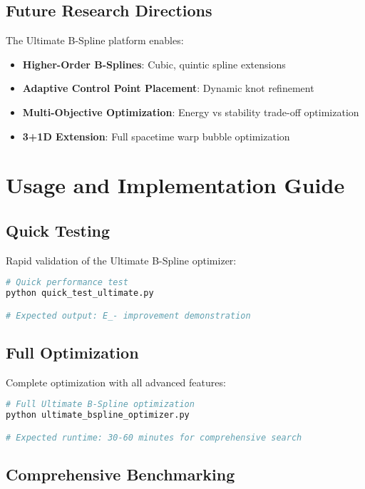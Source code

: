 \documentclass[11pt,a4paper]{article}
\begin{document}
\subsection{Future Research Directions}

The Ultimate B-Spline platform enables:

\begin{itemize}
\item \textbf{Higher-Order B-Splines}: Cubic, quintic spline extensions
\item \textbf{Adaptive Control Point Placement}: Dynamic knot refinement
\item \textbf{Multi-Objective Optimization}: Energy vs stability trade-off optimization
\item \textbf{3+1D Extension}: Full spacetime warp bubble optimization
\end{itemize}

\section{Usage and Implementation Guide}

\subsection{Quick Testing}

Rapid validation of the Ultimate B-Spline optimizer:

\begin{lstlisting}[language=bash]
# Quick performance test
python quick_test_ultimate.py

# Expected output: E_- improvement demonstration
\end{lstlisting}

\subsection{Full Optimization}

Complete optimization with all advanced features:

\begin{lstlisting}[language=bash]
# Full Ultimate B-Spline optimization
python ultimate_bspline_optimizer.py

# Expected runtime: 30-60 minutes for comprehensive search
\end{lstlisting}

\subsection{Comprehensive Benchmarking}
\end{document}
